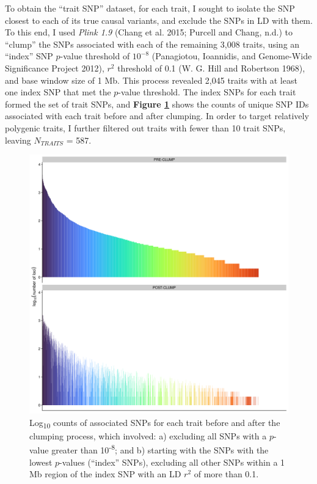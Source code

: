 \documentclass[
]{book}
\begin{document}
To obtain the ``trait SNP'' dataset, for each trait, I sought to isolate the SNP closest to each of its true causal variants, and exclude the SNPs in LD with them. To this end, I used \emph{Plink 1.9} (Chang et al. 2015; Purcell and Chang, n.d.) to ``clump'' the SNPs associated with each of the remaining 3,008 traits, using an ``index'' SNP \(p\)-value threshold of \(10^{-8}\) (Panagiotou, Ioannidis, and Genome-Wide Significance Project 2012), \(r^2\) threshold of 0.1 (W. G. Hill and Robertson 1968), and base window size of 1 Mb. This process revealed 2,045 traits with at least one index SNP that met the \(p\)-value threshold. The index SNPs for each trait formed the set of trait SNPs, and \textbf{Figure \ref{fig:FstSnpCount}} shows the counts of unique SNP IDs associated with each trait before and after clumping. In order to target relatively polygenic traits, I further filtered out traits with fewer than 10 trait SNPs, leaving \(N_{TRAITS}\) = 587.



\begin{figure}
\includegraphics[width=1\linewidth]{figs/fst/0.1_1000_20220314_snp_counts} \caption{Log\textsubscript{10} counts of associated SNPs for each trait before and after the clumping process, which involved: a) excluding all SNPs with a \(p\)-value greater than 10\textsuperscript{-8}; and b) starting with the SNPs with the lowest \(p\)-values (``index'' SNPs), excluding all other SNPs within a 1 Mb region of the index SNP with an LD \(r^2\) of more than 0.1.}\label{fig:FstSnpCount}
\end{figure}
\end{document}
